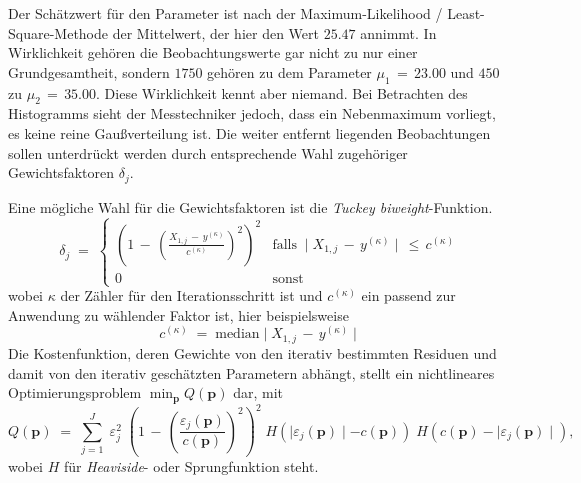 Der Schätzwert für den Parameter ist nach der Maximum-Likelihood / Least-Square-Methode der
Mittelwert, der hier den Wert $25.47$ annimmt. In Wirklichkeit gehören die Beobachtungswerte gar nicht zu
nur einer Grundgesamtheit, sondern $1750$ gehören zu dem Parameter $\mu_1 \, = \, 23.00$ und $450$ zu $\mu_2 \, = \, 35.00$.
Diese Wirklichkeit kennt aber niemand. Bei Betrachten des Histogramms sieht der Messtechniker jedoch, dass ein
Nebenmaximum vorliegt, es keine reine Gaußverteilung ist. Die weiter entfernt liegenden Beobachtungen sollen unterdrückt werden
durch entsprechende Wahl zugehöriger Gewichtsfaktoren $\delta_j$.

Eine mögliche Wahl für die Gewichtsfaktoren ist die \textsl{Tuckey biweight}-Funktion.
\begin{equation}
\delta_j \; = \;
\left\{ \begin{array}{cl}
\left( 1 \, - \, \left( \frac{X_{1,j} \, - \, y^{(\kappa)}}{c^{(\kappa)}} \right)^2 \right)^2 & 
	\mathrm{falls} \; \mid X_{1,j} \, - \, y^{(\kappa)} \mid \, \leq \, c^{(\kappa)} \\
0 & \mathrm{sonst}
\end{array} \right.
\end{equation}
wobei $\kappa$ der Zähler für den Iterationsschritt ist und $c^{(\kappa)}$ ein passend zur Anwendung zu wählender Faktor ist, hier beispielsweise
\begin{equation}
c^{(\kappa)} \; = \; \mathrm{median} \mid X_{1,j} \, - \, y^{(\kappa)} \mid 
\end{equation}
Die Kostenfunktion, deren Gewichte von den iterativ bestimmten Residuen und damit von den
iterativ geschätzten Parametern abhängt, stellt ein nichtlineares Optimierungsproblem
$ \min_{\mathbf{p}} Q(\mathbf{p}) $ dar, mit
\begin{equation}
Q(\mathbf{p}) \; = \; \sum_{j=1}^J \; \varepsilon_j^2 \;
\left( 1 \, - \, \left( \frac{\varepsilon_j(\mathbf{p}) }{c(\mathbf{p})} \right)^2 \right)^2 \;
H(\mid \varepsilon_j(\mathbf{p}) \mid - c(\mathbf{p})) \;
H(c(\mathbf{p}) - \mid \varepsilon_j(\mathbf{p}) \mid ),
\label{robustEstim2}
\end{equation}
wobei $H$ für \textsl{Heaviside}- oder Sprungfunktion steht.

